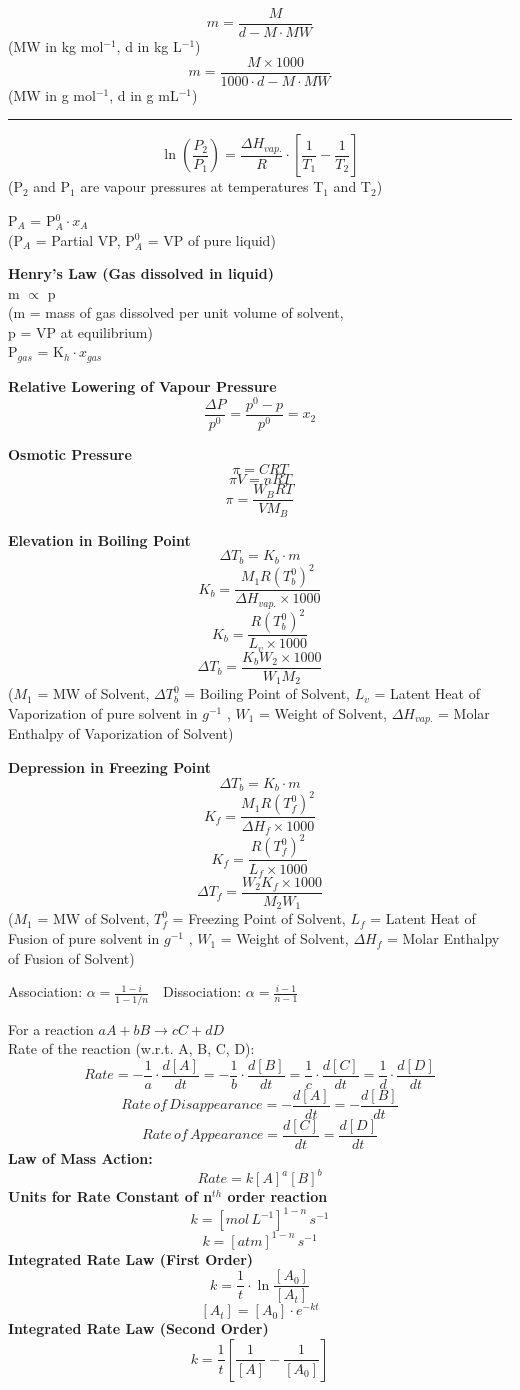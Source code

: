 \documentclass[fleqn, a4paper, 8pt, twocolumn]{article}
\begin{document}
\[m = \frac{M}{d-M\cdot MW}\] 
(MW in kg mol$^{-1}$, d in kg L$^{-1}$)\\

\[m = \frac{M\times 1000}{1000\cdot d - M\cdot MW}\]
(MW in g mol$^{-1}$, d in g mL$^{-1}$)

\noindent\rule[0.5ex]{\linewidth}{0.5pt}
\[\ln\left(\frac{P_2}{P_1}\right) = \frac{\Delta H_{vap.}}{R}\cdot \left[\frac{1}{T_1} - \frac{1}{T_2}\right]\]
(P$_2$ and P$_1$ are vapour pressures at temperatures T$_1$ and T$_2$)

P$_A$ = P$_A^0\cdot x_A$ \\
(P$_A$ = Partial VP, P$_A^0$ = VP of pure liquid)

\textbf{Henry's Law (Gas dissolved in liquid)}\\
m $\propto$ p\\
(m = mass of gas dissolved per unit volume of solvent,\\
p = VP at equilibrium)\\
P$_{gas}$ = K$_h \cdot x_{gas}$

\textbf{Relative Lowering of Vapour Pressure}
\[\frac{\Delta P}{p^0} = \frac{p^0 - p}{p^0} = x_2\]

\textbf{Osmotic Pressure}
\[\pi = CRT\]
\[\pi V = nRT\]
\[\pi = \frac{W_BRT}{VM_B}\]

\textbf{Elevation in Boiling Point}
\[\Delta T_b = K_b\cdot m\]
\[K_b = \frac{M_1R(T_b^0)^2}{\Delta H_{vap.}\times 1000}\]
\[K_b = \frac{R(T_b^0)^2}{L_v\times 1000}\]
\[\Delta T_b = \frac{K_bW_2\times 1000}{W_1M_2}\]
($M_1$ = MW of Solvent, $\Delta T_b^0$ = Boiling Point of Solvent, $L_v$ = Latent Heat of Vaporization of pure solvent in $g^{-1}$
, $W_1$ = Weight of Solvent, $\Delta H_{vap.}$ = Molar Enthalpy of Vaporization of Solvent)

\textbf{Depression in Freezing Point}
\[\Delta T_b = K_b\cdot m\]
\[K_f = \frac{M_1R(T_f^0)^2}{\Delta H_f \times 1000}\]
\[K_f = \frac{R(T_f^0)^2}{L_f \times 1000}\]
\[\Delta T_f = \frac{W_2K_f\times 1000}{M_2W_1}\]
($M_1$ = MW of Solvent, $T_f^0$ = Freezing Point of Solvent, $L_f$ = Latent Heat of Fusion of pure solvent in $g^{-1}$
, $W_1$ = Weight of Solvent, $\Delta H_f$ = Molar Enthalpy of Fusion of Solvent)

Association: $\alpha = \frac{1-i}{1-1/n}$ \,\, Dissociation: $\alpha = \frac{i-1}{n-1}$


For a reaction $aA + bB \to cC + dD$\\
Rate of the reaction (w.r.t. A, B, C, D):\\
\[Rate = -\frac{1}{a}\cdot\frac{d[A]}{dt} = -\frac{1}{b}\cdot\frac{d[B]}{dt} = \frac{1}{c}\cdot\frac{d[C]}{dt} = \frac{1}{d}\cdot\frac{d[D]}{dt}\]
\[Rate\, of\, Disappearance = -\frac{d[A]}{dt} = -\frac{d[B]}{dt}\]
\[Rate\, of\, Appearance = \frac{d[C]}{dt} = \frac{d[D]}{dt}\]
\textbf{Law of Mass Action:}
\[Rate = k[A]^a[B]^b\]
\textbf{Units for Rate Constant of n$^{th}$ order reaction}
\[k = [mol\, L^{-1}]^{1-n} \, s^{-1}\]
\[k = [atm]^{1-n} \, s^{-1}\]
\textbf{Integrated Rate Law (First Order)}
\[k = \frac{1}{t}\cdot\ln\frac{[A_0]}{[A_t]}\]
\[[A_t] = [A_0]\cdot e^{-kt}\]
\textbf{Integrated Rate Law (Second Order)}
\[k = \frac{1}{t}\left[\frac{1}{[A]} - \frac{1}{[A_0]} \right]\]
\end{document}
